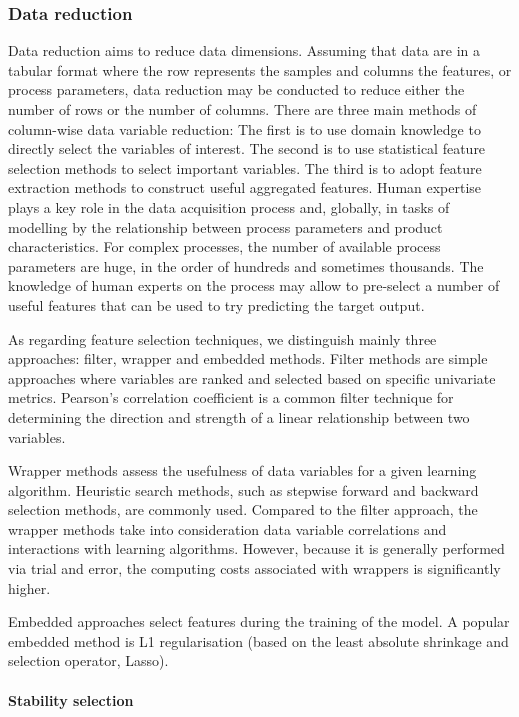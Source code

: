 \subsubsection{Data reduction}

Data reduction aims to reduce data dimensions. Assuming that data are in a tabular format where the row represents the samples and columns the features, or process parameters, data reduction may be conducted to reduce either the number of rows or the number of columns.
There are three main methods of column-wise data variable reduction: The first is to use domain knowledge to directly select the variables of interest. The second is to use statistical feature selection methods to select important variables. The third is to adopt feature extraction methods to construct useful aggregated features.
Human expertise plays a key role in the data acquisition process and, globally, in tasks of modelling by the relationship between process parameters and product characteristics. For complex processes, the number of available process parameters are huge, in the order of hundreds and sometimes thousands. The knowledge of human experts on the process may allow to pre-select a number of useful features that can be used to try predicting the target output. 

As regarding feature selection techniques, we distinguish mainly three approaches: filter, wrapper and embedded methods. Filter methods are simple approaches where variables are ranked and selected based on specific univariate metrics. Pearson's correlation coefficient is a common filter technique for determining the direction and strength of a linear relationship between two variables. 

Wrapper methods assess the usefulness of data variables for a given learning algorithm. Heuristic search methods, such as stepwise forward and backward selection methods, are commonly used. Compared to the filter approach, the wrapper methods take into consideration data variable correlations and interactions with learning algorithms. However, because it is generally performed via trial and error, the computing costs associated with wrappers is significantly higher. 

Embedded approaches select features during the training of the model. A popular embedded method is L1 regularisation (based on the least absolute shrinkage and selection operator, Lasso).

\paragraph{Stability selection} \label{Stability Selection}

